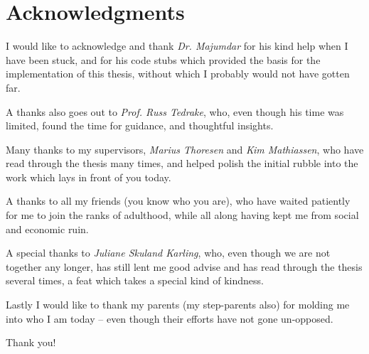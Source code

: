 \chapter{Acknowledgments}

\noindent \textsf{I} would like to acknowledge and thank \textit{Dr.
  Majumdar} for his kind help when I have been stuck, and for his code stubs
which provided the basis for the implementation of this thesis, without which I
probably would not have gotten far.

\vspace{1em}

\noindent \textsf{A} thanks also goes out to \textit{Prof. Russ
  Tedrake}, who, even though his time was limited, found the time for guidance,
and thoughtful insights.

\vspace{1em}

\noindent \textsf{M}any thanks to my supervisors, \textit{Marius
  Thoresen} and \textit{Kim Mathiassen}, who have read through the thesis many
times, and helped polish the initial rubble into the work which lays in front of
you today.

\vspace{1em}

\noindent \textsf{A} thanks to all my friends (you know who you are),
who have waited patiently for me to join the ranks of adulthood, while all along
having kept me from social and economic ruin.

\vspace{1em}

\noindent \textsf{A} special thanks to \textit{Juliane Skuland
  Karling}, who, even though we are not together any longer, has still lent me
good advise and has read through the thesis several times, a feat which takes a
special kind of kindness.

\vspace{1em}

\noindent \textsf{L}astly I would like to thank my parents (my
step-parents also) for molding me into who I am today -- even though their
efforts have not gone un-opposed.

\vspace{3em}

{
  \centering \textsf{Thank you!}\par
}
